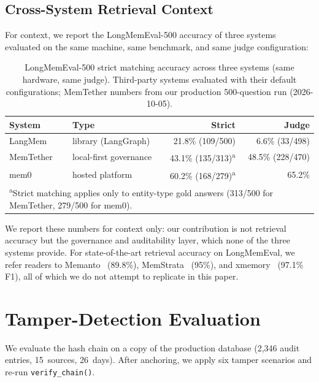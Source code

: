 ﻿\documentclass{article}
\begin{document}
\subsection{Cross-System Retrieval Context}
\label{sec:crosssys}
For context, we report the LongMemEval-500 accuracy of three systems evaluated on the same machine, same benchmark, and same judge configuration:

\begin{table}[h]
\centering
\caption{LongMemEval-500 strict matching accuracy across three systems (same hardware, same judge). Third-party systems evaluated with their default configurations; MemTether numbers from our production 500-question run (2026-10-05).}
\label{tab:crosssys}
\begin{tabular}{llrr}
\toprule
System & Type & Strict & Judge \\
\midrule
LangMem & library (LangGraph) & 21.8\% (109/500) & 6.6\% (33/498) \\
MemTether & local-first governance & 43.1\% (135/313)\textsuperscript{a} & 48.5\% (228/470) \\
mem0 & hosted platform & 60.2\% (168/279)\textsuperscript{a} & 65.2\% \\
\bottomrule
\multicolumn{4}{l}{\textsuperscript{a}Strict matching applies only to entity-type gold answers (313/500 for MemTether, 279/500 for mem0).}\\
\end{tabular}
\end{table}

We report these numbers for context only: our contribution is not retrieval accuracy but the governance and auditability layer, which none of the three systems provide. For state-of-the-art retrieval accuracy on LongMemEval, we refer readers to Memanto~\citep{memanto} (89.8\%), MemStrata~\citep{memstrata} (95\%), and xmemory~\citep{xmemory} (97.1\% F1), all of which we do not attempt to replicate in this paper.

\section{Tamper-Detection Evaluation}
\label{sec:tamper}

We evaluate the hash chain on a copy of the production database (2{,}346 audit entries, 15~sources, 26~days). After anchoring, we apply six tamper scenarios and re-run \texttt{verify\_chain()}.
\end{document}
